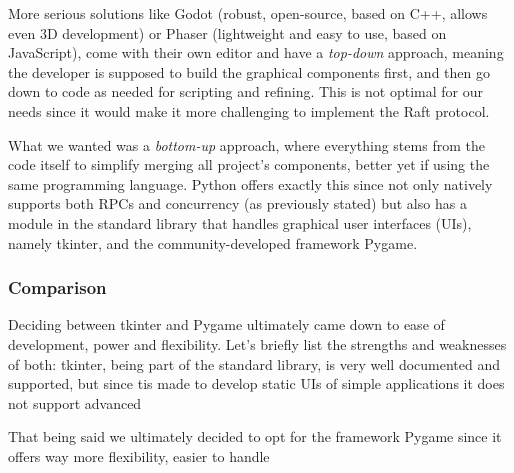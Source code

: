 More serious solutions like Godot (robust, open-source, based on C++, allows even 3D development) or Phaser (lightweight and easy to use, based on JavaScript), come with their own editor and have a \textit{top-down} approach, meaning the developer is supposed to build the graphical components first, and then go down to code as needed for scripting and refining. This is not optimal for our needs since it would make it more challenging to implement the Raft protocol.

What we wanted was a \textit{bottom-up} approach, where everything stems from the code itself to simplify merging all project's components, better yet if using the same programming language. Python offers exactly this since not only natively supports both RPCs and concurrency (as previously stated) but also has a module in the standard library that handles graphical user interfaces (UIs), namely tkinter, and the community-developed framework Pygame.

\subsubsection{Comparison}

Deciding between tkinter and Pygame ultimately came down to ease of development, power and flexibility. Let's briefly list the strengths and weaknesses of both: tkinter, being part of the standard library, is very well documented and supported, but since tis made to develop static UIs of simple applications it does not support advanced 

That being said we ultimately decided to opt for the framework Pygame since it offers way more flexibility, easier to handle   